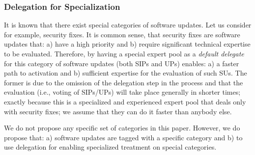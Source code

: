 \subsubsection{Delegation for Specialization} \label{appxdelspecial}
It is known that there exist special categories of software updates. Let us consider for example, security fixes. It is common sense, that security fixes are software updates that: a) have a high priority and b) require significant technical expertise to be evaluated. Therefore, by having a special expert pool as a \emph{default delegate} for this category of software updates (both SIPs and UPs) enables: a) a faster path to activation and b) sufficient expertise for the evaluation of such SUs. The former is due to the omission of the delegation step in the process and that the evaluation (i.e., voting of SIPs/UPs) will take place generally in shorter times; exactly because this is a specialized and experienced expert pool that deals only with security fixes; we assume that they can do it faster than anybody else.


We do not propose any specific set of categories in this paper. However, we do propose that: a) software updates are tagged with a specific category and b) to use delegation for enabling specialized treatment on special categories.

